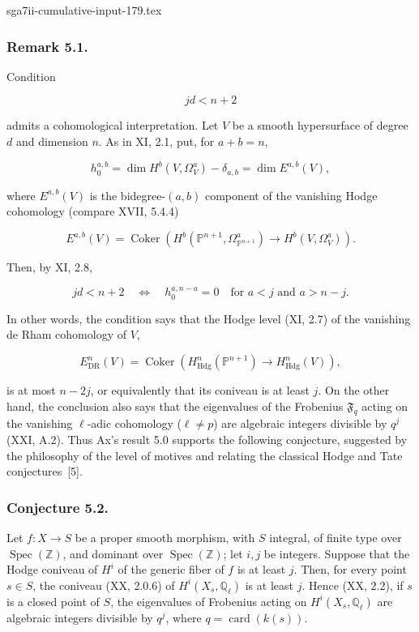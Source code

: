 \begin{filecontents*}{sga7ii-cumulative-input-179.tex}
\subsubsection*{Remark 5.1.}
Condition

\begin{equation}\tag{5.1.1}
jd<n+2
\end{equation}

admits a cohomological interpretation.  Let $V$ be a smooth hypersurface of
degree $d$ and dimension $n$.  As in XI, 2.1, put, for $a+b=n$,

\begin{equation}\tag{5.1.2}
h_0^{a,b}
=\dim H^b(V,\Omega_V^a)-\delta_{a,b}
=\dim E^{a,b}(V),
\end{equation}

where $E^{a,b}(V)$ is the bidegree-$(a,b)$ component of the vanishing Hodge
cohomology (compare XVII, 5.4.4)

\begin{equation}\tag{5.1.3}
E^{a,b}(V)
=\operatorname{Coker}\!\left(
H^b(\mathbb P^{n+1},\Omega_{\mathbb P^{n+1}}^a)
\longrightarrow H^b(V,\Omega_V^a)\right).
\end{equation}

Then, by XI, 2.8,

\begin{equation}\tag{5.1.4}
jd<n+2
\quad\Longleftrightarrow\quad
h_0^{a,n-a}=0\quad\text{for }a<j\text{ and }a>n-j.
\end{equation}

In other words, the condition says that the Hodge level (XI, 2.7) of the
vanishing de Rham cohomology of $V$,

\[
E_{\mathrm{DR}}^n(V)
=\operatorname{Coker}\!\left(
H_{\mathrm{Hdg}}^n(\mathbb P^{n+1})
\longrightarrow H_{\mathrm{Hdg}}^n(V)\right),
\]

is at most $n-2j$, or equivalently that its coniveau is at least $j$.
On the other hand, the conclusion also says that the eigenvalues of the
Frobenius $\mathfrak F_q$ acting on the vanishing $\ell$-adic cohomology
($\ell\ne p$) are algebraic integers divisible by $q^j$ (XXI, A.2).
Thus Ax's result 5.0 supports the following conjecture, suggested by the
philosophy of the level of motives and relating the classical Hodge and
Tate conjectures~[5].

\subsubsection*{Conjecture 5.2.}
Let $f:X\to S$ be a proper smooth morphism, with $S$ integral, of finite
type over $\operatorname{Spec}(\mathbb Z)$, and dominant over
$\operatorname{Spec}(\mathbb Z)$; let $i,j$ be integers.  Suppose that the
Hodge coniveau of $H^i$ of the generic fiber of $f$ is at least $j$.  Then,
for every point $s\in S$, the coniveau (XX, 2.0.6) of
$H^i(X_s,\mathbb Q_\ell)$ is at least $j$.  Hence (XX, 2.2), if $s$ is a
closed point of $S$, the eigenvalues of Frobenius acting on
$H^i(X_s,\mathbb Q_\ell)$ are algebraic integers divisible by $q^j$, where
$q=\operatorname{card}(k(s))$.


\end{filecontents*}
